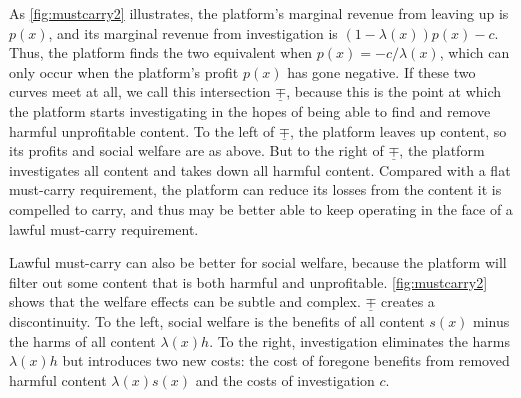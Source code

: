 As \autoref{fig:mustcarry2} illustrates, the platform's marginal revenue from leaving up is $p(x)$, and its marginal revenue from investigation is $(1 - \lambda(x))p(x) -c $. Thus, the platform finds the two equivalent when $p(x) = {-c}/{\lambda(x)}$, which can only occur when the platform's profit $p(x)$ has gone negative. If these two curves meet at all, we call this intersection $\underline{\mp}$, because this is the point at which the platform starts investigating in the hopes of being able to find and remove harmful unprofitable content. To the left of $\underline{\mp}$, the platform leaves up content, so its profits and social welfare are as above. But to the right of $\underline{\mp}$, the platform investigates all content and takes down all harmful content. Compared with a flat must-carry requirement, the platform can reduce its losses from the content it is compelled to carry, and thus may be better able to keep operating in the face of a lawful must-carry requirement.

Lawful must-carry can also be better for social welfare, because the platform will filter out some content that is both harmful and unprofitable. \autoref{fig:mustcarry2} shows that the welfare effects can be subtle and complex. $\underline{\mp}$ creates a discontinuity. To the left, social welfare is the benefits of all content $s(x)$ minus the harms of all content $\lambda(x)h$. To the right, investigation eliminates the harms $\lambda(x)h$ but introduces two new costs: the cost of foregone benefits from removed harmful content $\lambda(x)s(x)$ and the costs of investigation $c$. 

